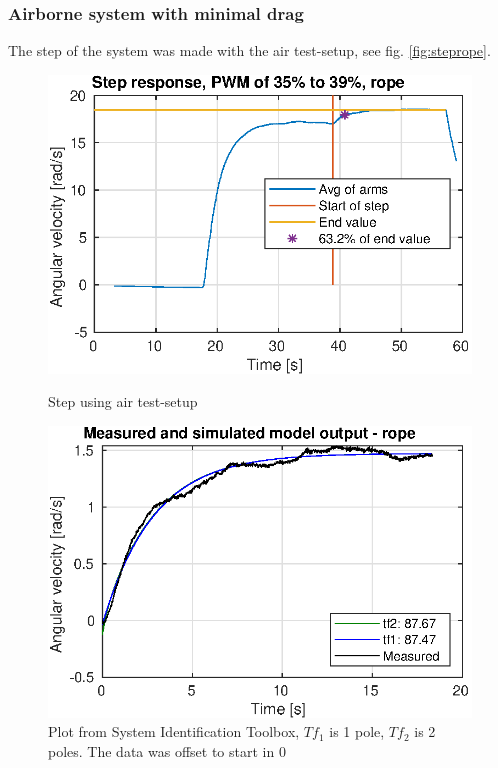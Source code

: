 \subsubsection{Airborne system with minimal drag}\label{sec:airminimal}
The step of the system was made with the air test-setup, see fig. \ref{fig:steprope}.
\begin{figure}[h!]
    \centering
    \begin{minipage}[t]{0.48\textwidth}
        \centering
        \includegraphics[width=1\textwidth]{figures/results/steprope.eps}
        \caption{Step using air test-setup}
        \label{fig:steprope}
    \end{minipage}%
    \hspace{.03\textwidth}
    \begin{minipage}[t]{0.48\textwidth}
        \centering
        \includegraphics[width=1\textwidth]{figures/results/steprope_sysid.eps}
        \caption{Plot from System Identification Toolbox, $Tf_1$ is 1 pole, $Tf_2$ is 2 poles. The data was offset to start in 0}
        \label{fig:stepropesysid}
    \end{minipage}
\end{figure} 

